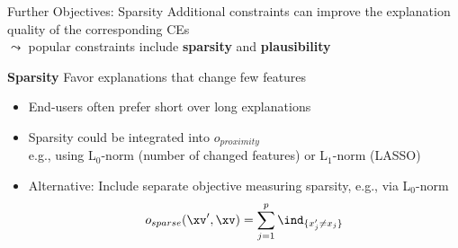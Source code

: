 \documentclass[11pt,compress,t,notes=noshow, aspectratio=169, xcolor=table, usenames,dvipsnames]{beamer}
\begin{document}
\begin{frame}{Further Objectives: Sparsity}
	Additional constraints can improve the explanation quality of the corresponding CEs\\
	$\leadsto$ popular constraints include \textbf{sparsity} and \textbf{plausibility}
	
	\lz

	\textbf{Sparsity} Favor explanations that change few features
	\begin{itemize}[<+->]
		\item End-users often prefer short over long explanations%
        \item Sparsity could be integrated into $o_{proximity}$ \\
        e.g., using L$_0$-norm (number of changed features) or L$_1$-norm (LASSO)
        \item Alternative: Include separate objective measuring sparsity, e.g., via L$_0$-norm
        $$o_{sparse}(\xv', \xv) = \sum_{j = 1}^p {\ind}_{\{ x'_j \neq x_j \}}$$
	\end{itemize}
\end{frame}
\end{document}
